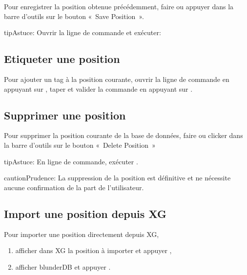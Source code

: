 \documentclass[letterpaper,10pt,french]{sphinxmanual}
\begin{document}
\sphinxAtStartPar
Pour enregistrer la position obtenue précédemment, faire  ou appuyer
dans la barre d’outils sur le bouton « Save Position ».

\begin{sphinxadmonition}{tip}{Astuce:}
\sphinxAtStartPar
Ouvrir la ligne de commande et exécuter: 
\end{sphinxadmonition}


\subsection{Etiqueter une position}
\label{\detokenize{guide_utilisateur:etiqueter-une-position}}
\sphinxAtStartPar
Pour ajouter un tag  à la position courante, ouvrir la ligne de commande en appuyant sur ,
taper  et valider la commande en appuyant sur .


\subsection{Supprimer une position}
\label{\detokenize{guide_utilisateur:supprimer-une-position}}
\sphinxAtStartPar
Pour supprimer la position courante de la base de données, faire  ou
clicker dans la barre d’outils sur le bouton « Delete Position »

\begin{sphinxadmonition}{tip}{Astuce:}
\sphinxAtStartPar
En ligne de commande, exécuter .
\end{sphinxadmonition}

\begin{sphinxadmonition}{caution}{Prudence:}
\sphinxAtStartPar
La suppression de la position est définitive et ne nécessite
aucune confirmation de la part de l’utilisateur.
\end{sphinxadmonition}


\subsection{Import une position depuis XG}
\label{\detokenize{guide_utilisateur:import-une-position-depuis-xg}}
\sphinxAtStartPar
Pour importer une position directement depuis XG,
\begin{enumerate}
%
\item {} 
\sphinxAtStartPar
afficher dans XG la position à importer et appuyer ,

\item {} 
\sphinxAtStartPar
afficher blunderDB et appuyer .

\end{enumerate}
\end{document}
